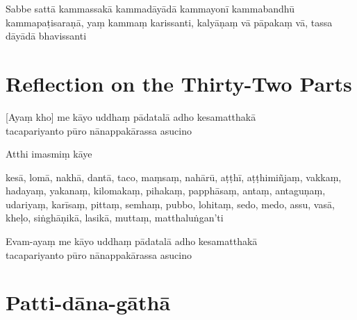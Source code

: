 Sabbe sattā kammassakā kammadāyādā kammayonī kammabandhū kammapaṭisaraṇā,
yaṃ kammaṃ karissanti, kalyāṇaṃ vā pāpakaṃ vā, tassa dāyādā bhavissanti 

\section{Reflection on the Thirty-Two Parts}

\begin{leader}
\end{leader}


[Ayaṃ kho] me kāyo uddhaṃ pādatalā adho kesamatthakā\\
tacapariyanto pūro nānappakārassa asucino

Atthi imasmiṃ kāye

kesā, lomā, nakhā, dantā, taco, maṃsaṃ, nahārū, aṭṭhī, aṭṭhimiñjaṃ, vakkaṃ, hadayaṃ, yakanaṃ, kilomakaṃ, pihakaṃ, papphāsaṃ, antaṃ, antaguṇaṃ, udariyaṃ, karīsaṃ, pittaṃ, semhaṃ, pubbo, lohitaṃ, sedo, medo, assu, vasā, kheḷo, siṅghāṇikā, lasikā, muttaṃ, matthaluṅgan'ti 

Evam-ayaṃ me kāyo uddhaṃ pādatalā adho kesamatthakā\\
tacapariyanto pūro nānappakārassa asucino\\

\vspace*{-\baselineskip}

\section{Patti-dāna-gāthā}



